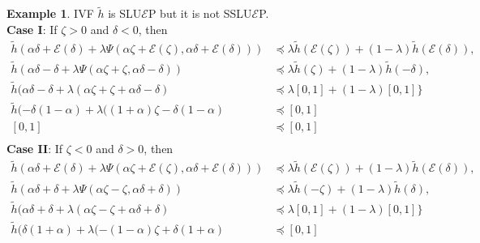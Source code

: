 \documentclass[12pt, reqno]{amsart}
\theoremstyle{definition}
\newtheorem{example}{Example}[section]
\theoremstyle{remark}
\numberwithin{equation}{section}
\begin{document}
\begin{example}
IVF \( \tilde{h} \) is SLU\(\mathcal{\mathcal{E}}\)P  but it is not SSLU\(\mathcal{\mathcal{E}}\)P.\\
\textbf{Case I}: If \( \mathit{\zeta}  > 0 \) and \( \mathit{\delta}  < 0 \), then
\begin{align*}
    \tilde{h} \left( \alpha \mathit{\delta}  + \mathcal{\mathcal{E}}(\mathit{\delta} ) + \lambda\Psi(\alpha \mathit{\zeta}  + \mathcal{\mathcal{E}}(\mathit{\zeta} ), \alpha \mathit{\delta}  + \mathcal{\mathcal{E}}(\mathit{\delta} )) \right) &\preceq \lambda \tilde{h}(\mathcal{E}(\mathit{\zeta} )) + (1 - \lambda) \tilde{h}(\mathcal{E}(\mathit{\delta} )), \\
    \tilde{h} (\alpha\mathit{\delta}  - \mathit{\delta}  + \lambda\Psi(\alpha\mathit{\zeta} +\mathit{\zeta} , \alpha\mathit{\delta} -\mathit{\delta} )) &\preceq \lambda \tilde{h}(\mathit{\zeta} ) + (1 - \lambda) \tilde{h}(-\mathit{\delta} ), \\
    \tilde{h} (\alpha\mathit{\delta}  - \mathit{\delta}  + \lambda(\alpha\mathit{\zeta} +\mathit{\zeta} +\alpha\mathit{\delta}  - \mathit{\delta}  ) &\preceq \lambda[0,1]+(1-\lambda)[0,1] \} \\ 
    \tilde{h} (-\mathit{\delta} (1-\alpha)+\lambda((1+\alpha)\mathit{\zeta} -\mathit{\delta}  (1-\alpha)  &\preceq [0,1] \\
    [0,1] &\preceq [0,1]\\
\end{align*}
\noindent
\textbf{Case II}: If \( \mathit{\zeta}  < 0 \) and \( \mathit{\delta}  > 0 \), then
\begin{align*}
    \tilde{h} \left( \alpha \mathit{\delta}  + \mathcal{\mathcal{E}}(\mathit{\delta} ) + \lambda\Psi(\alpha \mathit{\zeta}  + \mathcal{\mathcal{E}}(\mathit{\zeta} ), \alpha \mathit{\delta}  + \mathcal{\mathcal{E}}(\mathit{\delta} )) \right) &\preceq \lambda \tilde{h}(\mathcal{E}(\mathit{\zeta} )) + (1 - \lambda) \tilde{h}(\mathcal{E}(\mathit{\delta} )), \\
    \tilde{h} (\alpha\mathit{\delta}  + \mathit{\delta}  + \lambda\Psi(\alpha\mathit{\zeta} -\mathit{\zeta} , \alpha\mathit{\delta} +\mathit{\delta} )) &\preceq \lambda \tilde{h}(-\mathit{\zeta} ) + (1 - \lambda) \tilde{h}(\mathit{\delta} ), \\
    \tilde{h} (\alpha\mathit{\delta}  + \mathit{\delta}  + \lambda(\alpha\mathit{\zeta} -\mathit{\zeta} +\alpha\mathit{\delta}  + \mathit{\delta}  ) &\preceq \lambda[0,1]+(1-\lambda)[0,1] \} \\ 
    \tilde{h} (\mathit{\delta} (1+\alpha)+\lambda(-(1-\alpha)\mathit{\zeta} +\mathit{\delta}  (1+\alpha)  &\preceq [0,1] \\

\end{align*}
\end{example}
\end{document}
